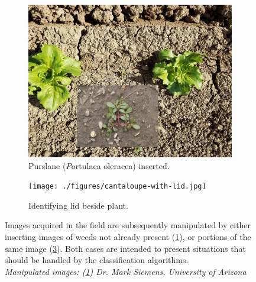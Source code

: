 \documentclass[letterpaper]{article}
\begin{document}
\begin{figure}[h]
	\begin{subfigure}[t]{0.48\linewidth}
		\includegraphics[width=1\linewidth]{./figures/with-purslane.jpg}
		\caption{Purslane (\textit Portulaca oleracea) inserted.}
		\label{fig:prepared-weed}
	\end{subfigure}
	\hfill
	\begin{subfigure}[t]{0.48\linewidth}
		\texttt{[image: ./figures/cantaloupe-with-lid.jpg]}
		\caption{Identifying lid beside plant.}
		\label{fig:prepared-lid}		
	\end{subfigure}%
	\caption[Prepared images]{Images acquired in the field are subsequently manipulated by either inserting images of weeds not already present (\ref{fig:prepared-weed}), or portions of the same image (\ref{fig:prepared-lid}). Both cases are intended to present situations that should be handled by the classification algorithms. \\ \textit{Manipulated images: (\ref{fig:prepared-weed}) Dr. Mark Siemens, University of Arizona}}
\end{figure}
\end{document}

